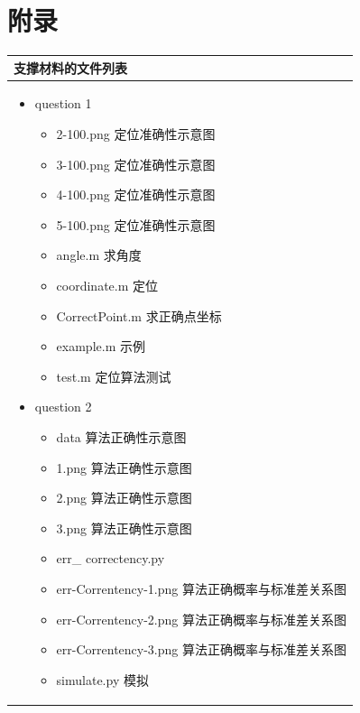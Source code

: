 \documentclass{my_paper}
\begin{document}
\begin{center}
\end{center}

\newpage
\section{附录}

\begin{table}[H]
    \centering
    \begin{tabular}{|p{14.0cm}|}
    \hline
    \textbf{支撑材料的文件列表} \\ %
    \hline
    \begin{itemize}
        \item question 1
        \begin{itemize}
            \item 2-100.png 定位准确性示意图
            \item 3-100.png 定位准确性示意图
            \item 4-100.png 定位准确性示意图
            \item 5-100.png 定位准确性示意图
            \item angle.m 求角度
            \item coordinate.m 定位
            \item CorrectPoint.m 求正确点坐标
            \item example.m 示例
            \item test.m 定位算法测试
        \end{itemize}
        \item question 2
        \begin{itemize}
            \item data 算法正确性示意图
            \item 1.png 算法正确性示意图
            \item 2.png 算法正确性示意图
            \item 3.png 算法正确性示意图
            \item err\_ correctency.py
            \item err-Correntency-1.png 算法正确概率与标准差关系图
            \item err-Correntency-2.png 算法正确概率与标准差关系图
            \item err-Correntency-3.png 算法正确概率与标准差关系图
            \item simulate.py 模拟
        \end{itemize}
    \end{itemize}
    \\
    \hline
    \end{tabular}
\end{table}
\end{document}
